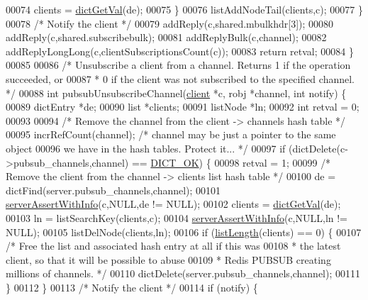 \begin{DoxyCode}
00074             clients = \hyperlink{dict_8h_ae8d2cc391873b2bea2b87c4f80f43120}{dictGetVal}(de);
00075         \}
00076         listAddNodeTail(clients,c);
00077     \}
00078     \textcolor{comment}{/* Notify the client */}
00079     addReply(c,shared.mbulkhdr[3]);
00080     addReply(c,shared.subscribebulk);
00081     addReplyBulk(c,channel);
00082     addReplyLongLong(c,clientSubscriptionsCount(c));
00083     \textcolor{keywordflow}{return} retval;
00084 \}
00085 
00086 \textcolor{comment}{/* Unsubscribe a client from a channel. Returns 1 if the operation succeeded, or}
00087 \textcolor{comment}{ * 0 if the client was not subscribed to the specified channel. */}
00088 \textcolor{keywordtype}{int} pubsubUnsubscribeChannel(\hyperlink{structclient}{client} *c, robj *channel, \textcolor{keywordtype}{int} notify) \{
00089     dictEntry *de;
00090     list *clients;
00091     listNode *ln;
00092     \textcolor{keywordtype}{int} retval = 0;
00093 
00094     \textcolor{comment}{/* Remove the channel from the client -> channels hash table */}
00095     incrRefCount(channel); \textcolor{comment}{/* channel may be just a pointer to the same object}
00096 \textcolor{comment}{                            we have in the hash tables. Protect it... */}
00097     \textcolor{keywordflow}{if} (dictDelete(c->pubsub\_channels,channel) == \hyperlink{dict_8h_a2afecbeab8f7efbc183048f52f6d17e5}{DICT\_OK}) \{
00098         retval = 1;
00099         \textcolor{comment}{/* Remove the client from the channel -> clients list hash table */}
00100         de = dictFind(server.pubsub\_channels,channel);
00101         \hyperlink{server_8h_a7308f76cbff9a8d3797fe78190b91282}{serverAssertWithInfo}(c,NULL,de != NULL);
00102         clients = \hyperlink{dict_8h_ae8d2cc391873b2bea2b87c4f80f43120}{dictGetVal}(de);
00103         ln = listSearchKey(clients,c);
00104         \hyperlink{server_8h_a7308f76cbff9a8d3797fe78190b91282}{serverAssertWithInfo}(c,NULL,ln != NULL);
00105         listDelNode(clients,ln);
00106         \textcolor{keywordflow}{if} (\hyperlink{adlist_8h_afde0ab079f934670e82119b43120e94b}{listLength}(clients) == 0) \{
00107             \textcolor{comment}{/* Free the list and associated hash entry at all if this was}
00108 \textcolor{comment}{             * the latest client, so that it will be possible to abuse}
00109 \textcolor{comment}{             * Redis PUBSUB creating millions of channels. */}
00110             dictDelete(server.pubsub\_channels,channel);
00111         \}
00112     \}
00113     \textcolor{comment}{/* Notify the client */}
00114     \textcolor{keywordflow}{if} (notify) \{

\end{DoxyCode}
